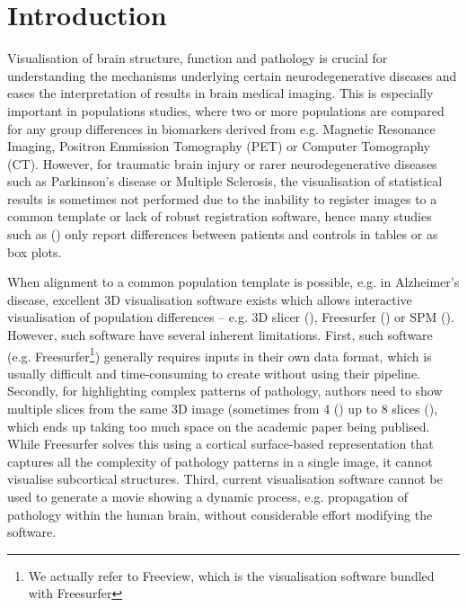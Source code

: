 \documentclass[final,times,twocolumn,authoryear]{elsarticle}
\begin{document}





\section{Introduction}
\label{intro}



Visualisation of brain structure, function and pathology is crucial for understanding the mechanisms underlying certain neurodegenerative diseases and eases the interpretation of results in brain medical imaging. This is especially important in populations studies, where two or more populations are compared for any group differences in biomarkers derived from e.g. Magnetic Resonance Imaging, Positron Emmission Tomography (PET) or Computer Tomography (CT). However, for traumatic brain injury or rarer neurodegenerative diseases such as Parkinson's disease or Multiple Sclerosis, the visualisation of statistical results is sometimes not performed due to the inability to register images to a common template or lack of robust registration software, hence many studies such as (\cite{coughlin2015neuroinflammation, mak2014subcortical, schoonheim2012subcortical, chard2002brain}) only report differences between patients and controls in tables or as box plots. 

When alignment to a common population template is possible, e.g. in Alzheimer's disease, excellent 3D visualisation software exists  which allows interactive visualisation of population differences -- e.g. 3D slicer (\cite{pieper20043d}), Freesurfer (\cite{fischl2012freesurfer}) or SPM (\cite{penny2011statistical}). However, such software have several inherent limitations. First, such software (e.g. Freesurfer\footnote{We actually refer to Freeview, which is the visualisation software bundled with Freesurfer}) generally requires inputs in their own data format, which is usually difficult and time-consuming to create without using their pipeline. Secondly, for highlighting complex patterns of pathology, authors need to show multiple slices from the same 3D image (sometimes from 4 (\cite{seeley2009neurodegenerative}) up to 8 slices (\cite{migliaccio2015mapping}), which ends up taking too much space on the academic paper being publised. While Freesurfer solves this using a cortical surface-based representation that captures all the complexity of pathology patterns in a single image, it cannot visualise subcortical structures. Third, current visualisation software cannot be used to generate a movie showing a dynamic process, e.g. propagation of pathology within the human brain, without considerable effort modifying the software.
\end{document}
